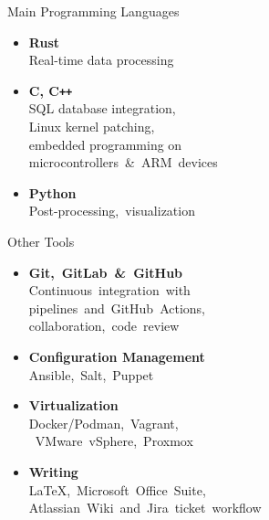{%
\begin{tcbraster}[raster columns=2, raster equal height, raster width=\textwidth, raster left skip=-5mm, raster right skip=-15mm]
  \begin{tcolorbox}[colback=white, boxrule=0pt, frame empty, nobeforeafter]
    {\color{textgray} Main Programming Languages }\\
    \vspace{-3mm}
    \begin{itemize}[left=0mm]
      \item \textbf{Rust}\\
        Real-time data processing
      \item \textbf{C, C\texttt{++}}\\
        SQL database integration,\\Linux kernel patching,\\embedded programming on\\ microcontrollers\ \&\ ARM\ devices
      \item \textbf{Python}\\
        Post-processing,\ visualization
    \end{itemize}
  \end{tcolorbox}
  \hspace{-10mm}
  \begin{tcolorbox}[colback=white, boxrule=0pt, frame empty, nobeforeafter]
    {\color{textgray} Other Tools }\\
    \vspace{-3mm}
    \begin{itemize}[left=0mm]
      \item \textbf{Git,~GitLab~\&~GitHub}\\
        Continuous~integration~with\\pipelines~and~GitHub~Actions,\\collaboration,~code~review%
      \item \textbf{Configuration Management}\\
        Ansible,~Salt,~Puppet
      \item \textbf{Virtualization}\\
        Docker/Podman,~Vagrant,\\~VMware~vSphere,~Proxmox
      \item \textbf{Writing}\\
        LaTeX,~Microsoft~Office~Suite,\\Atlassian~Wiki~and~Jira~ticket~workflow
    \end{itemize}
  \end{tcolorbox}
\end{tcbraster}

}

\newcommand{\CVSign}{
\begin{flushright}
    Munich, 15.04.2025\\
    \vspace{10mm}
    Bastian Schmidt
\end{flushright}
}

